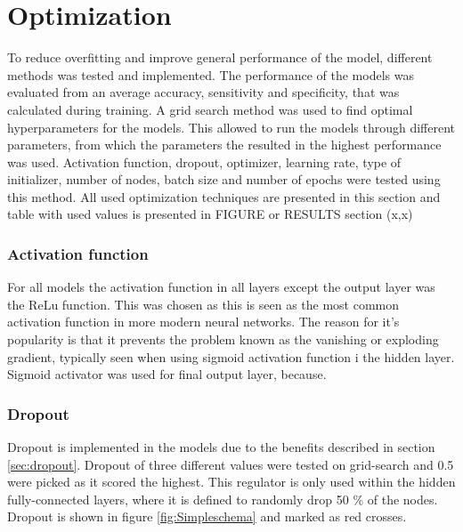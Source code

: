\section{Optimization}
To reduce overfitting and improve general performance of the model, different methods was tested and implemented. 
The performance of the models was evaluated from an average accuracy, sensitivity and specificity, that was calculated during training. 
A grid search method was used to find optimal hyperparameters for the models. This allowed to run the models through different parameters, from which the parameters the resulted in the highest performance was used. Activation function, dropout, optimizer, learning rate, type of initializer, number of nodes, batch size and number of epochs were tested using this method.  All used optimization techniques are presented in this section and table with used values is presented in FIGURE or RESULTS section (x,x)

\subsubsection{Activation function}
For all models the activation function in all layers except the output layer was the ReLu function. This was chosen as this is seen as the most common activation function in more modern neural networks. The reason for it's popularity is that it prevents the problem known as the vanishing or exploding gradient, typically seen when using sigmoid activation function i the hidden layer. \citep{Goodfellow2016}    
Sigmoid activator was used for final output layer, because.

\subsubsection{Dropout}
Dropout is implemented in the models due to the benefits described in section \ref{sec:dropout}. Dropout of three different values were tested on grid-search and 0.5 were picked as it scored the highest. This regulator is only used within the hidden fully-connected layers, where it is defined to randomly drop 50 \% of the nodes. Dropout is shown in figure \ref{fig:Simpleschema} and marked as red crosses. 

